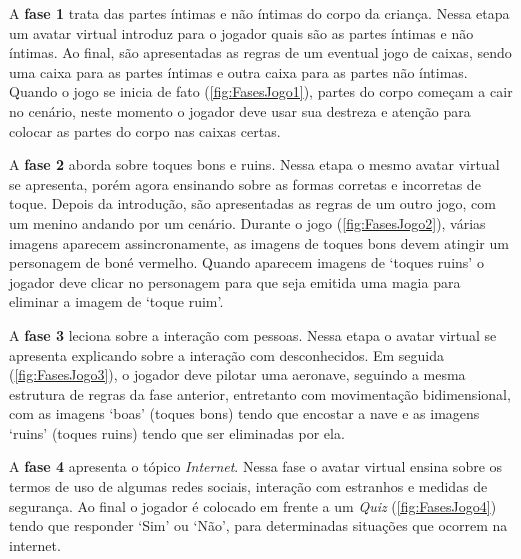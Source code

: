 \documentclass[alpha-refs,brazilian]{RBCA_v2.0}
\begin{document}
A \textbf{fase 1} trata das partes íntimas e não íntimas do corpo da criança. Nessa etapa um avatar virtual introduz para o jogador quais são as partes íntimas e não íntimas. Ao final, são apresentadas as regras de um eventual jogo de caixas, sendo uma caixa para as partes íntimas e outra caixa para as partes não íntimas. Quando o jogo se inicia de fato (\cref{fig:FasesJogo1}), partes do corpo começam a cair no cenário, neste momento o jogador deve usar sua destreza e atenção para colocar as partes do corpo nas caixas certas.

\newpage

A \textbf{fase 2} aborda sobre toques bons e ruins. Nessa etapa o mesmo avatar virtual se apresenta, porém agora ensinando sobre as formas corretas e incorretas de toque. Depois da introdução, são apresentadas as regras de um outro jogo, com um menino andando por um cenário. Durante o jogo (\cref{fig:FasesJogo2}), várias imagens aparecem assincronamente, as imagens de toques bons devem atingir um personagem de boné vermelho. Quando aparecem imagens de `toques ruins' o jogador deve clicar no personagem para que seja emitida uma magia para eliminar a imagem de `toque ruim'.

A \textbf{fase 3} leciona sobre a interação com pessoas. Nessa etapa o avatar virtual se apresenta explicando sobre a interação com desconhecidos. Em seguida (\cref{fig:FasesJogo3}), o jogador deve pilotar uma aeronave, seguindo a mesma estrutura de regras da fase anterior, entretanto com movimentação bidimensional, com as imagens `boas' (toques bons) tendo que encostar a nave e as imagens `ruins' (toques ruins) tendo que ser eliminadas por ela.

A \textbf{fase 4} apresenta o tópico \textit{Internet}. Nessa fase o avatar virtual ensina sobre os termos de uso de algumas redes sociais, interação com estranhos e medidas de segurança. Ao final o jogador é colocado em frente a um \textit{Quiz} (\cref{fig:FasesJogo4}) tendo que responder `Sim' ou `Não', para determinadas situações que ocorrem na internet.
\end{document}
